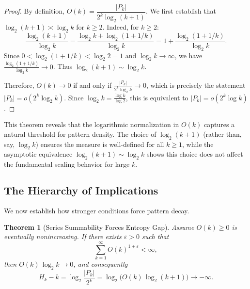 \documentclass[11pt]{article}
\newtheorem{theorem}{Theorem}
\theoremstyle{definition}
\newcommand{\eps}{\varepsilon}
\begin{document}
\begin{proof}
By definition, $O(k)=\dfrac{|P_k|}{2^k\log_2(k+1)}$. We first establish that $\log_2(k+1)\asymp\log_2 k$ for $k\geq 2$. Indeed, for $k\geq 2$:
$$\frac{\log_2(k+1)}{\log_2 k} = \frac{\log_2 k + \log_2(1 + 1/k)}{\log_2 k} = 1 + \frac{\log_2(1 + 1/k)}{\log_2 k}.$$
Since $0 < \log_2(1 + 1/k) < \log_2 2 = 1$ and $\log_2 k \to \infty$, we have $\frac{\log_2(1 + 1/k)}{\log_2 k} \to 0$. Thus $\log_2(k+1) \sim \log_2 k$.

Therefore, $O(k)\to 0$ if and only if $\frac{|P_k|}{2^k\log_2 k}\to 0$, which is precisely the statement $|P_k|=o(2^k\log_2 k)$. Since $\log_2 k = \frac{\log k}{\log 2}$, this is equivalent to $|P_k|=o(2^k\log k)$.
\end{proof}

This theorem reveals that the logarithmic normalization in $O(k)$ captures a natural threshold for pattern density. The choice of $\log_2(k+1)$ (rather than, say, $\log_2 k$) ensures the measure is well-defined for all $k \geq 1$, while the asymptotic equivalence $\log_2(k+1) \sim \log_2 k$ shows this choice does not affect the fundamental scaling behavior for large $k$.

\subsection{The Hierarchy of Implications}

We now establish how stronger conditions force pattern decay.

\begin{theorem}[Series Summability Forces Entropy Gap]\label{thm:series-to-entropy}
Assume $O(k)\ge 0$ is eventually nonincreasing. If there exists $\eps>0$ such that
\begin{equation}
\sum_{k=1}^{\infty} O(k)^{1+\eps} < \infty,
\end{equation}
then $O(k)\,\log_2 k\to 0$, and consequently
\begin{equation}
H_k-k=\log_2\frac{|P_k|}{2^k}=\log_2\big(O(k)\,\log_2(k+1)\big)\longrightarrow -\infty.
\end{equation}
\end{theorem}
\end{document}
